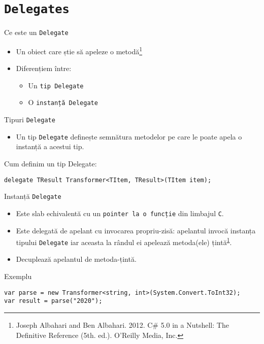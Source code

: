 \documentclass[presentation]{beamer}
\begin{document}
\section{\texttt{Delegates}}
\label{sec:orga35304c}
\begin{frame}[label={sec:org3eb7d18},fragile]{Ce este un \texttt{Delegate}}
 \begin{itemize}
\item Un obiect care știe să apeleze o metodă\footnote{Joseph Albahari and Ben Albahari. 2012. C\# 5.0 in a Nutshell: The Definitive Reference (5th. ed.). O’Reilly Media, Inc.\label{org083420e}}
\item Diferențiem între:
\begin{itemize}
\item Un \texttt{tip Delegate}
\item O \texttt{instanță Delegate}
\end{itemize}
\end{itemize}
\end{frame}
\begin{frame}[label={sec:org44cb6f4},fragile]{Tipuri \texttt{Delegate}}
 \begin{itemize}
\item Un tip \texttt{Delegate} definește semnătura metodelor pe care le poate apela o instanță a acestui tip.
\end{itemize}
\begin{block}{Cum definim un tip Delegate:}
\begin{verbatim}
delegate TResult Transformer<TItem, TResult>(TItem item);
\end{verbatim}
\end{block}
\end{frame}
\begin{frame}[label={sec:org508246d},fragile]{Instanță \texttt{Delegate}}
 \begin{itemize}
\item Este \alert{slab echivalentă} cu un \texttt{pointer la o funcție} din limbajul \texttt{C}.
\item Este delegată de apelant cu invocarea propriu-zisă: apelantul invocă instanța tipului \texttt{Delegate} iar aceasta la rândul ei apelează metoda(ele) țintă\textsuperscript{\ref{org083420e}}.
\item Decuplează apelantul de metoda-țintă.
\end{itemize}
\begin{block}{Exemplu}
\begin{verbatim}
var parse = new Transformer<string, int>(System.Convert.ToInt32);
var result = parse("2020");
\end{verbatim}
\end{block}
\end{frame}
\end{document}
